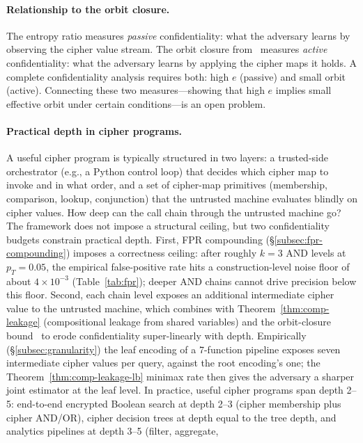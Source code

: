 \documentclass[11pt]{article}
\theoremstyle{definition}
\theoremstyle{plain}
\theoremstyle{remark}
\begin{document}
\paragraph{Relationship to the orbit closure.}
The entropy ratio measures \emph{passive} confidentiality: what the
adversary learns by observing the cipher value stream.  The orbit closure
from~\cite{towell2026algebraic} measures \emph{active} confidentiality:
what the adversary learns by applying the cipher maps it holds.  A
complete confidentiality analysis requires both: high $e$ (passive) and
small orbit (active).  Connecting these two measures---showing that high
$e$ implies small effective orbit under certain conditions---is an open
problem.

\paragraph{Practical depth in cipher programs.}
A useful cipher program is typically structured in two layers: a
trusted-side orchestrator (e.g., a Python control loop) that decides
which cipher map to invoke and in what order, and a set of cipher-map
primitives (membership, comparison, lookup, conjunction) that the
untrusted machine evaluates blindly on cipher values.  How deep can
the call chain through the untrusted machine go?  The framework does
not impose a structural ceiling, but two confidentiality budgets
constrain practical depth.  First, FPR compounding
(\S\ref{subsec:fpr-compounding}) imposes a correctness ceiling:
after roughly $k = 3$ AND levels at $p_T = 0.05$, the empirical
false-positive rate hits a construction-level noise floor of about
$4 \times 10^{-3}$ (Table~\ref{tab:fpr}); deeper AND chains cannot
drive precision below this floor.  Second, each chain level exposes
an additional intermediate cipher value to the untrusted machine,
which combines with Theorem~\ref{thm:comp-leakage} (compositional
leakage from shared variables) and the orbit-closure
bound~\cite[Thm.~5.3]{towell2026algebraic} to erode confidentiality
super-linearly with depth.  Empirically (\S\ref{subsec:granularity})
the leaf encoding of a 7-function pipeline exposes seven
intermediate cipher values per query, against the root encoding's
one; the Theorem~\ref{thm:comp-leakage-lb} minimax rate then gives
the adversary a sharper joint estimator at the leaf level.  In
practice, useful cipher programs span depth 2--5: end-to-end
encrypted Boolean search at depth 2--3 (cipher membership plus
cipher AND/OR), cipher decision trees at depth equal to the tree
depth, and analytics pipelines at depth 3--5 (filter, aggregate,
\end{document}

